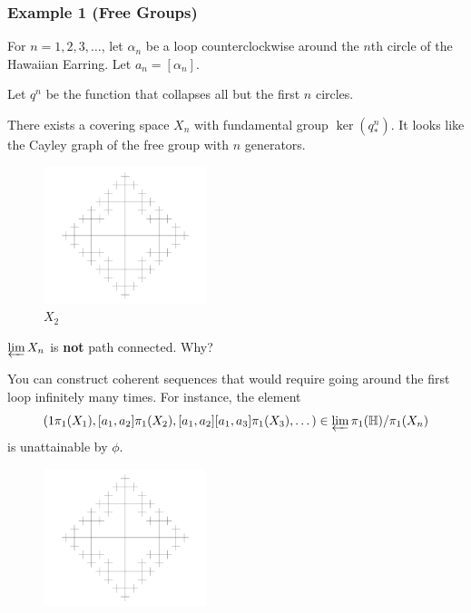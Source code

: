 \documentclass{beamer}
\newcommand{\HE}{\mathbb{H}}
\begin{document}
\begin{frame}[allowframebreaks]
\frametitle{Example 1 (Free Groups)}
For $n = 1, 2, 3, \dots$, let $\alpha_n$ be a loop counterclockwise around the $n$th circle of the Hawaiian Earring.  Let $a_n = [\alpha_n]$.

Let $q^n$ be the function that collapses all but the first $n$ circles.

\begin{figure}[h]
\centering{
\resizebox{!}{3cm}{\fontsize{20}{24}\selectfont {labelled_loops.pdf_tex}}
\resizebox{!}{3cm}{\fontsize{40}{48}\selectfont {collapse_circles.pdf_tex}}
}
\end{figure}

\pagebreak

There exists a covering space $X_n$ with fundamental group $\ker(q_*^n)$.  It looks like the Cayley graph of the free group with $n$ generators.
\begin{figure}[h]
\centering
\includegraphics[height=4cm]{images/cayley_graph.pdf}
\caption{$X_2$}
\end{figure}

\pagebreak

$\varprojlim X_n$ is \textbf{not} path connected.  Why?

You can construct coherent sequences that would require going around the first loop infinitely many times.  For instance, the element
$$(1\pi_1(X_1), [a_1, a_2]\pi_1(X_2), [a_1, a_2][a_1, a_3]\pi_1(X_3), \dots) \in \varprojlim \pi_1(\HE) / \pi_1(X_n)$$
is unattainable by $\phi$.

\begin{figure}[h]
\centering
\includegraphics[height=4cm]{images/cayley_graph.pdf}
\end{figure}
\end{frame}
\end{document}
